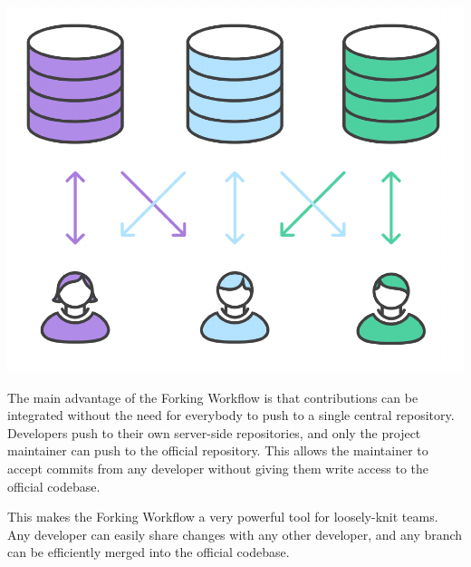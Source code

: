 \documentclass{article}
\begin{document}
\begin{center}
\includegraphics[scale=0.5]{figures/15.pdf}
\end{center}

The main advantage of the Forking Workflow is that contributions can
be integrated without the need for everybody to push to a single
central repository. Developers push to their own server-side
repositories, and only the project maintainer can push to the official
repository. This allows the maintainer to accept commits from any
developer without giving them write access to the official codebase.

This makes the Forking Workflow a very powerful tool for loosely-knit
teams. Any developer can easily share changes with any other
developer, and any branch can be efficiently merged into the official
codebase.
\end{document}
